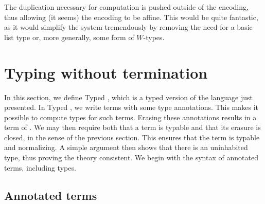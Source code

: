 \documentclass{article}
\begin{document}
\noindent The duplication necessary for computation is pushed outside of the
encoding, thus allowing (it seems) the encoding to be affine.  This would
be quite fantastic, as it would simplify the system tremendously by removing
the need for a basic list type or, more generally, some form of $W$-types.

\section{Typing without termination}

In this section, we define Typed \sar, which is a typed version of the
\sar language just presented.  In Typed \sar, we write terms with some
type annotations.  This makes it possible to compute types for such
terms.  Erasing these annotations results in a term of \sar.  We may
then require both that a term is typable and that its erasure is
closed, in the sense of the previous section.  This ensures that the
term is typable and normalizing.  A simple argument then shows that
there is an uninhabited type, thus proving the theory consistent.  We
begin with the syntax of annotated terms, including types.

\subsection{Annotated terms}
\end{document}
